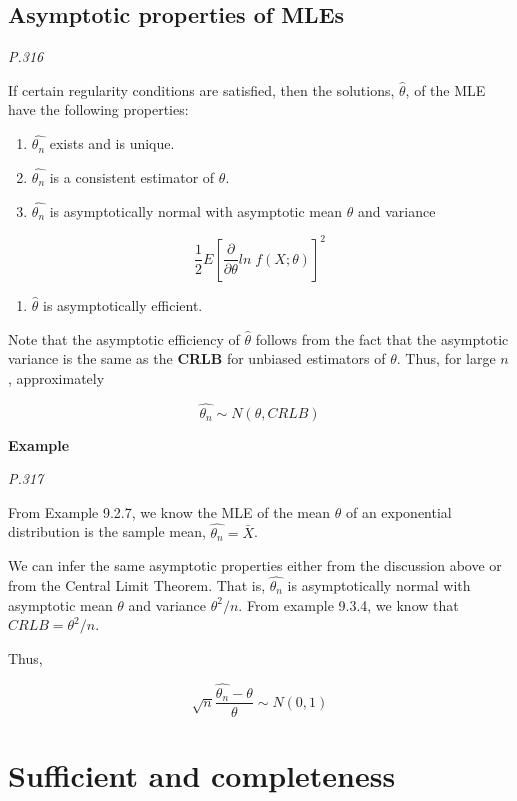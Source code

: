 \documentclass[]{book}
\providecommand{\tightlist}{%
  \setlength{\itemsep}{0pt}\setlength{\parskip}{0pt}}
\begin{document}
\hypertarget{asymptotic-properties-of-mles}{%
\subsection{Asymptotic properties of MLEs}\label{asymptotic-properties-of-mles}}

\emph{P.316}

If certain regularity conditions are satisfied, then the solutions, \(\hat{\theta}\), of the MLE have the following properties:

\begin{enumerate}
\def\labelenumi{(\arabic{enumi})}
\item
  \(\hat{\theta_n}\) exists and is unique.
\item
  \(\hat{\theta_n}\) is a consistent estimator of \(\theta\).
\item
  \(\hat{\theta_n}\) is asymptotically normal with asymptotic mean \(\theta\) and variance
\end{enumerate}

\[\frac{1}{2}E[\frac{\partial}{\partial\theta}ln \; f(X;\theta)]^2\]

\begin{enumerate}
\def\labelenumi{(\arabic{enumi})}
\setcounter{enumi}{3}
\tightlist
\item
  \(\hat{\theta}\) is asymptotically efficient.
\end{enumerate}

Note that the asymptotic efficiency of \(\hat{\theta}\) follows from the fact that the asymptotic variance is the same as the \textbf{CRLB} for unbiased estimators of \(\theta\). Thus, for large \(n\), approximately

\[\hat{\theta_n} \sim N(\theta, CRLB)\]

\textbf{Example}

\emph{P.317}

From Example 9.2.7, we know the MLE of the mean \(\theta\) of an exponential distribution is the sample mean, \(\hat{\theta_n}=\bar{X}\).

We can infer the same asymptotic properties either from the discussion above or from the Central Limit Theorem. That is, \(\hat{\theta_n}\) is asymptotically normal with asymptotic mean \(\theta\) and variance \(\theta^2/n\). From example 9.3.4, we know that \(CRLB=\theta^2/n\).

Thus,

\[\sqrt{n}\frac{\hat{\theta_n}-\theta}{\theta}\sim N(0,1)\]

\hypertarget{sufficient-and-completeness}{%
\section{Sufficient and completeness}\label{sufficient-and-completeness}}
\end{document}
